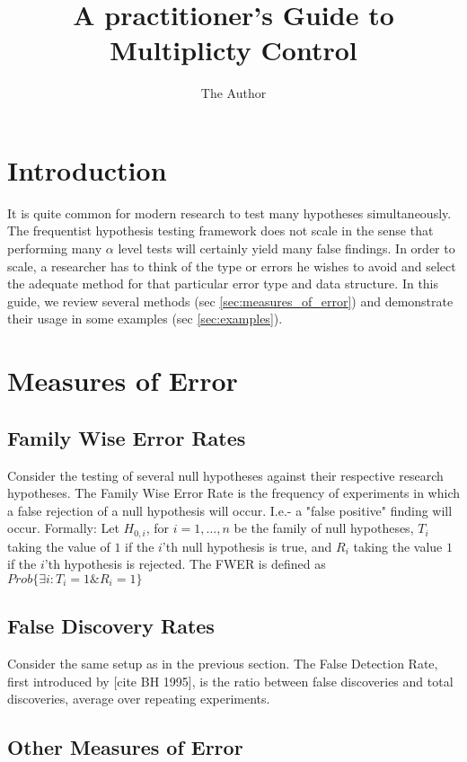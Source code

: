 \documentclass[11pt]{amsart}
\title{A practitioner's Guide to Multiplicty Control}
\author{The Author}
\begin{document}
\maketitle


\section{Introduction}
It is quite common for modern research to test many hypotheses simultaneously. The frequentist hypothesis testing framework does not scale in the sense that performing many $\alpha$ level tests will certainly yield many false findings. In order to scale, a researcher has to think of the type or errors he wishes to avoid and select the adequate method for that particular error type and data structure. In this guide, we review several methods (sec \ref{sec:measures_of_error}) and demonstrate their usage in some examples (sec \ref{sec:examples}).

\section{\label{sec:measures_of_error}Measures of Error}

\subsection{Family Wise Error Rates}
Consider the testing of several null hypotheses against their respective research hypotheses. The Family Wise Error Rate is the frequency of experiments in which a false rejection of a null hypothesis will occur. I.e.- a "false positive" finding will occur.
Formally: Let $H_{0,i}$, for $i=1,\ldots,n$ be the family of null hypotheses, $T_i$ taking the value of $1$ if the $i$'th null hypothesis is true,  and $R_i$ taking the value $1$ if the $i$'th hypothesis is rejected.
The FWER is defined as $Prob\{\exists i:T_i=1 \& R_i=1     \}$

\subsection{False Discovery Rates}
Consider the same setup as in the previous section. The False Detection Rate, first introduced by [cite BH 1995], is the ratio between false discoveries and total discoveries, average over repeating experiments. 

\subsection{Other Measures of Error}
\end{document}
